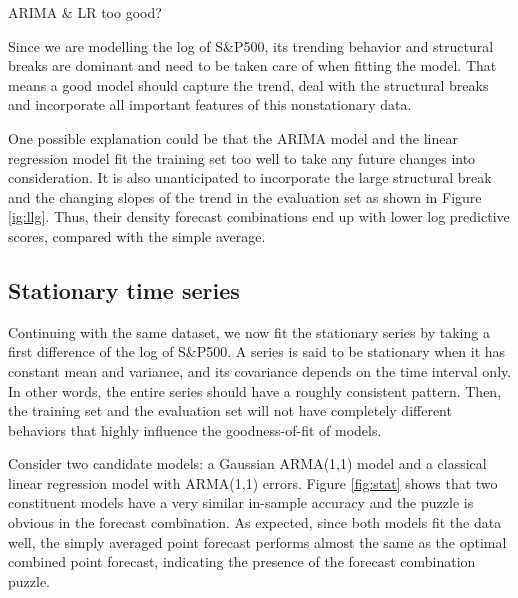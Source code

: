 \documentclass{monashthesis}
\begin{document}
ARIMA \& LR too good?

Since we are modelling the log of S\&P500, its trending behavior and structural breaks are dominant and need to be taken care of when fitting the model. That means a good model should capture the trend, deal with the structural breaks and incorporate all important features of this nonstationary data.

One possible explanation could be that the ARIMA model and the linear regression model fit the training set too well to take any future changes into consideration. It is also unanticipated to incorporate the large structural break and the changing slopes of the trend in the evaluation set as shown in Figure \ref{ig:llg}. Thus, their density forecast combinations end up with lower log predictive scores, compared with the simple average.

\hypertarget{stationary-time-series}{%
\subsection{Stationary time series}\label{stationary-time-series}}

Continuing with the same dataset, we now fit the stationary series by taking a first difference of the log of S\&P500. A series is said to be stationary when it has constant mean and variance, and its covariance depends on the time interval only. In other words, the entire series should have a roughly consistent pattern. Then, the training set and the evaluation set will not have completely different behaviors that highly influence the goodness-of-fit of models.

Consider two candidate models: a Gaussian ARMA(1,1) model and a classical linear regression model with ARMA(1,1) errors. Figure \ref{fig:stat} shows that two constituent models have a very similar in-sample accuracy and the puzzle is obvious in the forecast combination. As expected, since both models fit the data well, the simply averaged point forecast performs almost the same as the optimal combined point forecast, indicating the presence of the forecast combination puzzle.
\end{document}
